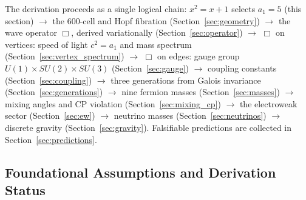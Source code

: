 \documentclass[12pt,a4paper]{article}
\theoremstyle{definition}
\begin{document}
The derivation proceeds as a single logical chain: $x^2 = x + 1$ selects $a_1 = 5$ (this section) $\to$ the 600-cell and Hopf fibration (Section~\ref{sec:geometry}) $\to$ the wave operator $\Box$, derived variationally (Section~\ref{sec:operator}) $\to$ $\Box$ on vertices: speed of light $c^2 = a_1$ and mass spectrum (Section~\ref{sec:vertex_spectrum}) $\to$ $\Box$ on edges: gauge group $U(1) \times SU(2) \times SU(3)$ (Section~\ref{sec:gauge}) $\to$ coupling constants (Section~\ref{sec:coupling}) $\to$ three generations from Galois invariance (Section~\ref{sec:generations}) $\to$ nine fermion masses (Section~\ref{sec:masses}) $\to$ mixing angles and CP violation (Section~\ref{sec:mixing_cp}) $\to$ the electroweak sector (Section~\ref{sec:ew}) $\to$ neutrino masses (Section~\ref{sec:neutrinos}) $\to$ discrete gravity (Section~\ref{sec:gravity}).  Falsifiable predictions are collected in Section~\ref{sec:predictions}.

\subsection{Foundational Assumptions and Derivation Status}
\label{sec:foundations}
\end{document}
